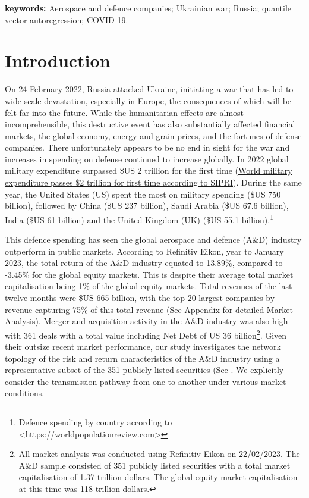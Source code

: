 \documentclass[
  number]{elsarticle}
\begin{document}
\textbf{keywords:} Aerospace and defence companies; Ukrainian war;
Russia; quantile vector-autoregression; COVID-19.

\hypertarget{introduction}{%
\section{Introduction}\label{introduction}}

On 24 February 2022, Russia attacked Ukraine, initiating a war that has
led to wide scale devastation, especially in Europe, the consequences of
which will be felt far into the future. While the humanitarian effects
are almost incomprehensible, this destructive event has also
substantially affected financial markets, the global economy, energy and
grain prices, and the fortunes of defense companies. There unfortunately
appears to be no end in sight for the war and increases in spending on
defense continued to increase globally. In 2022 global military
expenditure surpassed \$US 2 trillion for the first time
(\href{https://www.sipri.org/media/press-release/2022/world-military-expenditure-passes-2-trillion-first-time}{World
military expenditure passes \$2 trillion for first time according to
SIPRI}). During the same year, the United States (US) spent the most on
military spending (\$US 750 billion), followed by China (\$US 237
billion), Saudi Arabia (\$US 67.6 billion), India (\$US 61 billion) and
the United Kingdom (UK) (\$US 55.1 billion).\footnote{Defence spending
  by country according to
  \textless https://worldpopulationreview.com\textgreater{}}

This defence spending has seen the global aerospace and defence (A\&D)
industry outperform in public markets. According to Refinitiv Eikon,
year to January 2023, the total return of the A\&D industry equated to
13.89\%, compared to -3.45\% for the global equity markets. This is
despite their average total market capitalisation being 1\% of the
global equity markets. Total revenues of the last twelve months were
\$US 665 billion, with the top 20 largest companies by revenue capturing
75\% of this total revenue (See Appendix for detailed Market Analysis).
Merger and acquisition activity in the A\&D industry was also high with
361 deals with a total value including Net Debt of US 36
billion\footnote{All market analysis was conducted using Refinitiv Eikon
  on 22/02/2023. The A\&D sample consisted of 351 publicly listed
  securities with a total market capitalisation of 1.37 trillion
  dollars. The global equity market capitalisation at this time was 118
  trillion dollars.}. Given their outsize recent market performance, our
study investigates the network topology of the risk and return
characteristics of the A\&D industry using a representative subset of
the 351 publicly listed securities (See . We explicitly consider the
transmission pathway from one to another under various market
conditions.
\end{document}

